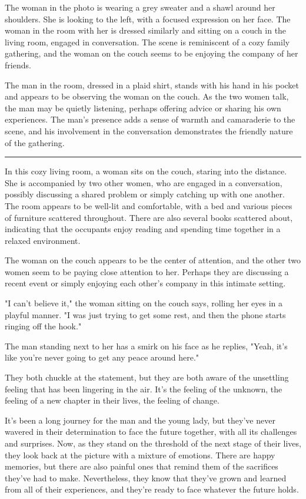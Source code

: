 \documentclass[smalldemyvopaper,11pt,twoside,onecolumn,openright,extrafontsizes]{memoir}
\begin{document}
The woman in the photo is wearing a grey sweater and a shawl around her shoulders. She is looking to the left, with a focused expression on her face. The woman in the room with her is dressed similarly and sitting on a couch in the living room, engaged in conversation. The scene is reminiscent of a cozy family gathering, and the woman on the couch seems to be enjoying the company of her friends.\par
The man in the room, dressed in a plaid shirt, stands with his hand in his pocket and appears to be observing the woman on the couch. As the two women talk, the man may be quietly listening, perhaps offering advice or sharing his own experiences. The man's presence adds a sense of warmth and camaraderie to the scene, and his involvement in the conversation demonstrates the friendly nature of the gathering.\par
\fancybreak{* * *}
In this cozy living room, a woman sits on the couch, staring into the distance. She is accompanied by two other women, who are engaged in a conversation, possibly discussing a shared problem or simply catching up with one another. The room appears to be well-lit and comfortable, with a bed and various pieces of furniture scattered throughout. There are also several books scattered about, indicating that the occupants enjoy reading and spending time together in a relaxed environment.\par
The woman on the couch appears to be the center of attention, and the other two women seem to be paying close attention to her. Perhaps they are discussing a recent event or simply enjoying each other's company in this intimate setting.\par
"I can't believe it," the woman sitting on the couch says, rolling her eyes in a playful manner. "I was just trying to get some rest, and then the phone starts ringing off the hook."\par
The man standing next to her has a smirk on his face as he replies, "Yeah, it's like you're never going to get any peace around here."\par
They both chuckle at the statement, but they are both aware of the unsettling feeling that has been lingering in the air. It's the feeling of the unknown, the feeling of a new chapter in their lives, the feeling of change.\par
It's been a long journey for the man and the young lady, but they've never wavered in their determination to face the future together, with all its challenges and surprises. Now, as they stand on the threshold of the next stage of their lives, they look back at the picture with a mixture of emotions. There are happy memories, but there are also painful ones that remind them of the sacrifices they've had to make. Nevertheless, they know that they've grown and learned from all of their experiences, and they're ready to face whatever the future holds.\par
\end{document}
